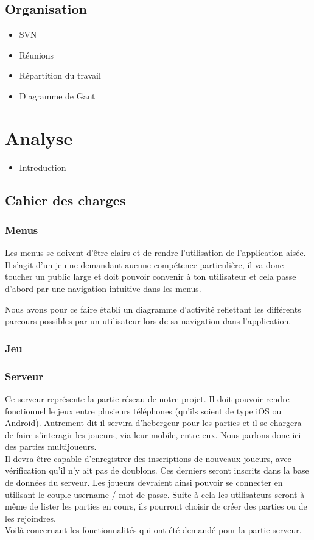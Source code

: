 \documentclass[]{report}
\begin{document}
	\section{Organisation}
		\begin{itemize}
			\item{SVN}
			\item{Réunions}
			\item{Répartition du travail}
			\item{Diagramme de Gant}
		\end{itemize}
	
	
\chapter{Analyse}
	\begin{itemize}
		\item{Introduction}
	\end{itemize}
	
	\section{Cahier des charges}
		\subsection{Menus}
		
		Les menus se doivent d'être clairs et de rendre l'utilisation de
		l'application aisée. Il s'agit d'un jeu ne demandant aucune compétence
		particulière, il va donc toucher un public large et doit pouvoir convenir à
		ton utilisateur et cela passe d'abord par une navigation intuitive dans les
		menus.
		
		Nous avons pour ce faire établi un diagramme d'activité reflettant les
		différents parcours possibles par un utilisateur lors de sa navigation dans
		l'application.
		
		\subsection{Jeu}
		\subsection{Serveur}
		
		Ce serveur représente la partie réseau de notre projet. Il doit pouvoir
		rendre fonctionnel le jeux entre plusieurs téléphones (qu'ils soient de type
		iOS ou Android). Autrement dit il servira d'hebergeur pour les parties et
		il se chargera de faire s'interagir les joueurs, via leur mobile, entre eux.
		Nous parlons donc ici des parties multijoueurs.\\ 
		Il devra être capable d'enregistrer des inscriptions de nouveaux joueurs, avec
		 vérification qu'il n'y ait pas de doublons. Ces derniers seront inscrits dans la base de données du serveur. Les joueurs devraient ainsi
		pouvoir se connecter en utilisant le couple username / mot de passe. Suite à
		cela les utilisateurs seront à même de lister les parties en cours, ils
		pourront choisir de créer des parties ou de les rejoindres.\\
		Voilà concernant les fonctionnalités qui ont été demandé pour la partie
		serveur.
	
\end{document}
